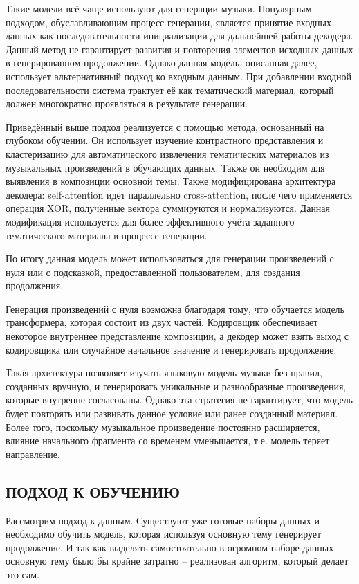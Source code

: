     Такие модели всё чаще используют для генерации музыки. Популярным подходом, обуславливающим процесс генерации, является принятие входных данных как последовательности инициализации для дальнейшей работы декодера. 
    Данный метод не гарантирует развития и повторения элементов исходных данных в генерированном продолжении. 
    Однако данная модель, описанная далее, использует альтернативный подход ко входным данным. При добавлении входной последовательности система трактует её как тематический материал, который должен многократно проявляться в результате генерации.
    
    Приведённый выше подход реализуется с помощью метода, основанный на глубоком обучении. Он использует изучение контрастного представления и кластеризацию для автоматического извлечения тематических материалов из музыкальных произведений в обучающих данных. Также он необходим для выявления в композиции основной темы. Также модифицирована архитектура декодера: self-attention идёт параллельно cross-attention, после чего применяется операция XOR, полученные вектора суммируются и нормализуются. Данная модификация используется для более эффективного учёта заданного тематического материала в процессе генерации.

    По итогу данная модель может использоваться для генерации произведений с нуля или с подсказкой, предоставленной пользователем, для создания продолжения. 
    
    Генерация произведений с нуля возможна благодаря тому, что обучается модель трансформера, которая состоит из двух частей. Кодировщик обеспечивает некоторое внутреннее представление композиции, а декодер может взять выход с кодировщика или случайное начальное значение и генерировать продолжение.
    
    Такая архитектура позволяет изучать языковую модель музыки без правил, созданных вручную, и генерировать уникальные и разнообразные произведения, которые внутренне согласованы. Однако эта стратегия не гарантирует, что модель будет повторять или развивать данное условие или ранее созданный материал. Более того, поскольку музыкальное произведение постоянно расширяется, влияние начального фрагмента со временем уменьшается, т.е. модель теряет направление.
    
    \subsection{ПОДХОД К ОБУЧЕНИЮ}
    Рассмотрим подход к данным. Существуют уже готовые наборы данных и необходимо обучить модель, которая используя основную тему генерирует продолжение. И так как выделять самостоятельно в огромном наборе данных основную тему было бы крайне затратно -- реализован алгоритм, который делает это сам. 
    
